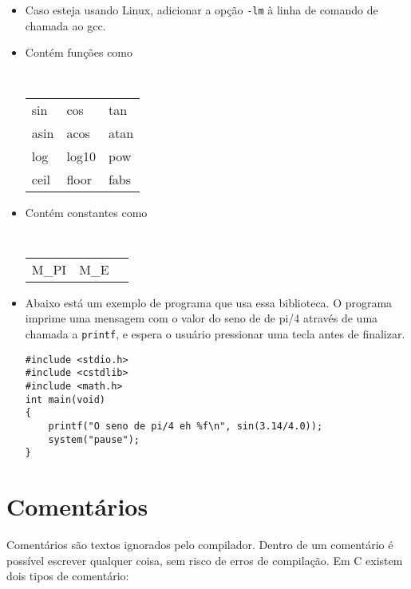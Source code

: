 \documentclass{book}
\newcommand{\PRINTF}{{\tt printf}}
\begin{document}
\begin{itemize}

\item Caso esteja usando Linux, adicionar a opção {\tt -lm} à linha de comando de chamada ao gcc.

\item Contém funções como

{\tt
\begin{tabular}{lll}
sin      & cos      & tan     \\
asin     & acos     & atan    \\
log      & log10    & pow     \\
ceil     & floor    & fabs    \\
\end{tabular}
}

\item Contém constantes como

{\tt
\begin{tabular}{lll}
M\_PI    & M\_E     &         \\
\end{tabular}
}

\item Abaixo está um exemplo de programa que usa essa biblioteca. O programa imprime uma mensagem com o valor do seno de de pi/4 através de uma chamada a \PRINTF, e espera o usuário pressionar uma tecla antes de finalizar.

\begin{lstlisting}
#include <stdio.h>
#include <cstdlib>
#include <math.h>
int main(void)
{
    printf("O seno de pi/4 eh %f\n", sin(3.14/4.0));
    system("pause");
}
\end{lstlisting}

\end{itemize}


\section{Comentários}

Comentários são textos ignorados pelo compilador. Dentro de um comentário é possível escrever qualquer coisa, sem risco de erros de compilação. Em C existem dois tipos de comentário:
\end{document}
